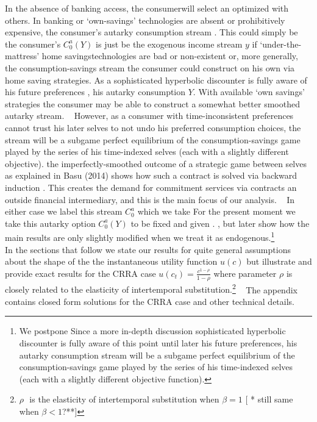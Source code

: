 \documentclass[11pt]{article}%
\providecommand{\DIFadd}[1]{{\protect\color{blue} \sf #1}} %
\providecommand{\DIFdel}[1]{{\protect\color{red} \scriptsize #1}} %
\providecommand{\DIFaddbegin}{} %
\providecommand{\DIFaddend}{} %
\providecommand{\DIFdelbegin}{} %
\providecommand{\DIFdelend}{} %
\begin{document}
\DIFdel{In the absence of banking access, the consumerwill select an optimized
}\DIFdelend \DIFaddbegin \DIFadd{with others. In banking or `own-savings' technologies are absent or prohibitively expensive, the consumer's }\DIFaddend autarky
consumption stream \DIFdelbegin \DIFdel{. This could simply be the consumer's }\DIFdelend \DIFaddbegin \DIFadd{$C_{0}^{a}(Y)$ is  just be the }\DIFaddend exogenous income stream
\DIFdelbegin \DIFdel{$y$ if `under-the-mattress' home savingstechnologies are bad
or non-existent or, more generally, the consumption-savings stream the
consumer could construct on his own via home saving strategies. As a sophisticated hyperbolic discounter is fully aware of his future
preferences , his autarky consumption }\DIFdelend \DIFaddbegin \DIFadd{$Y.$  With available `own savings' strategies the consumer may be able to
construct a somewhat better smoothed autarky stream. }\ \DIFadd{However, as
a consumer with time-inconsistent preferences cannot trust his later selves to not undo his
preferred consumption choices, the }\DIFaddend stream will be \DIFdelbegin \DIFdel{a subgame perfect
equilibrium of the consumption-savings game played by the series of his
time-indexed selves (each with a slightly different objective). }\DIFdelend \DIFaddbegin \DIFadd{the imperfectly-smoothed outcome of a strategic game between selves as explained in }\DIFaddend Basu
(2014)\DIFdelbegin \DIFdel{shows how such a contract is solved via  backward induction}\DIFdelend \DIFaddbegin \DIFadd{. This creates the demand for commitment services via  contracts an outside financial intermediary, and this is the main focus of our analysis}\DIFaddend . \ \DIFdelbegin \DIFdel{In either case
we label this stream $C_{0}^{a}$ which we take }\DIFdelend \DIFaddbegin \DIFadd{For the present moment we take this
autarky option $C_{0}^{a}(Y)$ }\DIFaddend to be fixed and given\DIFdelbegin \DIFdel{.%
}\DIFdelend \DIFaddbegin \DIFadd{, but later show how the main results
are only slightly modified when we treat it as endogenous.}\DIFaddend \footnote{%
\DIFdelbegin \DIFdel{We postpone }\DIFdelend \DIFaddbegin \DIFadd{Since }\DIFaddend a
\DIFdelbegin \DIFdel{more in-depth discussion }\DIFdelend \DIFaddbegin \DIFadd{sophisticated hyperbolic discounter is fully aware }\DIFaddend of \DIFdelbegin \DIFdel{this point until later}\DIFdelend \DIFaddbegin \DIFadd{his future preferences,
his autarky consumption stream will be a subgame perfect equilibrium of the
consumption-savings game played by the series of his time-indexed selves (each
with a slightly different objective function)}\DIFaddend .}
\DIFaddbegin \\ \DIFadd{In the sections that follow we state our results for quite general assumptions
about the shape of the the instantaneous utility function $u(c)$ but
illustrate and provide exact results for the CRRA case $u(c_{t})=\frac
{c^{1-\rho}}{1-\rho}$ where parameter $\rho$ is closely related to the
elasticity of intertemporal substitution.}\footnote{\DIFadd{ \(\)\(\rho \text{ }\)is the elasticity
of intertemporal substitution when $\beta=1$ }[\DIFadd{** still same when \(\beta<1\)?**}]} \DIFaddend \ \DIFaddbegin \DIFadd{The appendix contains closed form solutions for the CRRA case and other technical details. 
}\DIFaddend 
\end{document}
